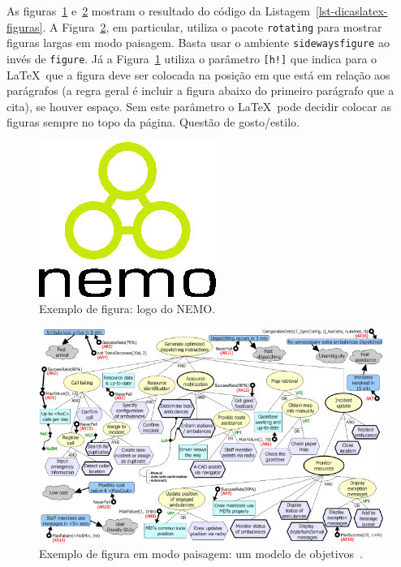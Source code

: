 As figuras~\ref{fig-dicaslatex-nemologo} e~\ref{fig-dicaslatex-exemplosideways} mostram o resultado do código da Listagem~\ref{lst-dicaslatex-figuras}. A Figura~\ref{fig-dicaslatex-exemplosideways}, em particular, utiliza o pacote \texttt{rotating} para mostrar figuras largas em modo paisagem. Basta usar o ambiente \texttt{sidewaysfigure} ao invés de \texttt{figure}. Já a Figura~\ref{fig-dicaslatex-nemologo} utiliza o parâmetro \texttt{[h!]} que indica para o \LaTeX\ que a figura deve ser colocada na posição em que está em relação aos parágrafos (a regra geral é incluir a figura abaixo do primeiro parágrafo que a cita), se houver espaço. Sem este parâmetro o \LaTeX\ pode decidir colocar as figuras sempre no topo da página. Questão de gosto/estilo.

\begin{figure}[h!]
	\centering
	\includegraphics[width=.25\textwidth]{figuras/fig-dicaslatex-nemologo} 
	\caption{Exemplo de figura: logo do NEMO.}
	\label{fig-dicaslatex-nemologo}
\end{figure}

\begin{figure}
\centering
\includegraphics[width=\textwidth]{figuras/fig-dicaslatex-exemplosideways} 
\caption{Exemplo de figura em modo paisagem: um modelo de objetivos~\cite{souza-mylopoulos:spe13}.}
\label{fig-dicaslatex-exemplosideways}
\end{figure}



